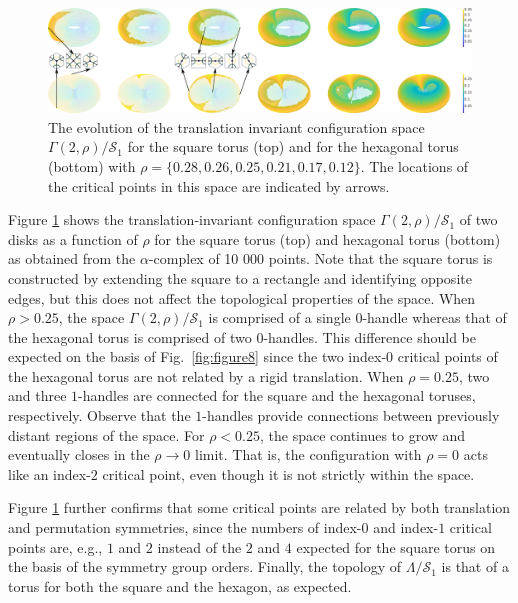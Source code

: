 \documentclass[default,iicol]{sn-jnl}%
\theoremstyle{thmstyleone}%
\theoremstyle{thmstyletwo}%
\theoremstyle{thmstylethree}%
\begin{document}
\begin{figure}
	\centering
	\includegraphics[width=1.0\textwidth]{figure9.eps}
	\caption{The evolution of the translation invariant configuration space $\Gamma(2, \rho) / \mathcal{S}_1$ for the square torus (top) and for the hexagonal torus (bottom) with $\rho=\{0.28, 0.26, 0.25, 0.21, 0.17, 0.12\}$. The locations of the critical points in this space are indicated by arrows.}
	\label{fig:figure9}
\end{figure}

Figure \ref{fig:figure9} shows the translation-invariant configuration space $\Gamma(2, \rho) / \mathcal{S}_1$ of two disks as a function of $\rho$ for the square torus (top) and hexagonal torus (bottom) as obtained from the $\alpha$-complex of 10 000 points. Note that the square torus is constructed by extending the square to a rectangle and identifying opposite edges, but this does not affect the topological properties of the space. When $\rho > 0.25$, the space $\Gamma(2, \rho) / \mathcal{S}_1$ is comprised of a single $0$-handle whereas that of the hexagonal torus is comprised of two $0$-handles. This difference should be expected on the basis of Fig.\ \ref{fig:figure8} since the two index-$0$ critical points of the hexagonal torus are not related by a rigid translation. When $\rho = 0.25$, two and three $1$-handles are connected for the square and the hexagonal toruses, respectively. Observe that the $1$-handles provide connections between previously distant regions of the space. For $\rho < 0.25$, the space continues to grow and eventually closes in the $\rho \rightarrow 0$ limit. That is, the configuration with $\rho = 0$ acts like an index-$2$ critical point, even though it is not strictly within the space.

Figure \ref{fig:figure9} further confirms that some critical points are related by both translation and permutation symmetries, since the numbers of index-$0$ and index-$1$ critical points are, e.g., $1$ and $2$ instead of the $2$ and $4$ expected for the square torus on the basis of the symmetry group orders. Finally, the topology of $\Lambda / \mathcal{S}_1$ is that of a torus for both the square and the hexagon, as expected.
\end{document}
